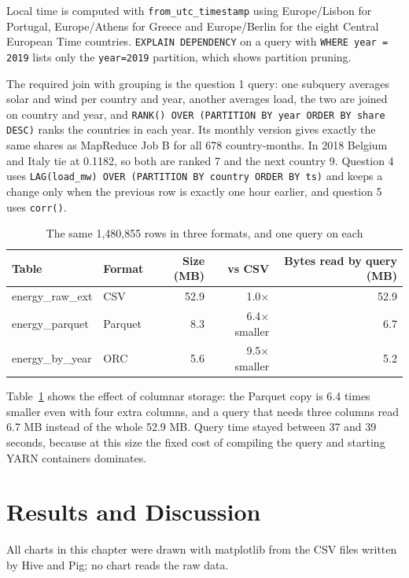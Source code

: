 \documentclass[12pt,a4paper]{report}
\begin{document}
Local time is computed with \texttt{from\_utc\_timestamp} using Europe/Lisbon for Portugal, Europe/Athens for Greece and Europe/Berlin for the eight Central European Time countries. \texttt{EXPLAIN DEPENDENCY} on a query with \texttt{WHERE year = 2019} lists only the \texttt{year=2019} partition, which shows partition pruning.

The required join with grouping is the question 1 query: one subquery averages solar and wind per country and year, another averages load, the two are joined on country and year, and \texttt{RANK() OVER (PARTITION BY year ORDER BY share DESC)} ranks the countries in each year. Its monthly version gives exactly the same shares as MapReduce Job B for all 678 country-months. In 2018 Belgium and Italy tie at 0.1182, so both are ranked 7 and the next country 9. Question 4 uses \texttt{LAG(load\_mw) OVER (PARTITION BY country ORDER BY ts)} and keeps a change only when the previous row is exactly one hour earlier, and question 5 uses \texttt{corr()}.

\begin{table}[H]
\centering\small
\caption{The same 1,480,855 rows in three formats, and one query on each}\label{tab:formats}
\begin{tabular}{llrrr}
\toprule
Table & Format & Size (MB) & vs CSV & Bytes read by query (MB)\\
\midrule
energy\_raw\_ext & CSV & 52.9 & 1.0$\times$ & 52.9\\
energy\_parquet & Parquet & 8.3 & 6.4$\times$ smaller & 6.7\\
energy\_by\_year & ORC & 5.6 & 9.5$\times$ smaller & 5.2\\
\bottomrule
\end{tabular}
\end{table}

Table~\ref{tab:formats} shows the effect of columnar storage: the Parquet copy is 6.4 times smaller even with four extra columns, and a query that needs three columns read 6.7 MB instead of the whole 52.9 MB. Query time stayed between 37 and 39 seconds, because at this size the fixed cost of compiling the query and starting YARN containers dominates.

\chapter{Results and Discussion}\label{ch:results}

All charts in this chapter were drawn with matplotlib \cite{hunter2007} from the CSV files written by Hive and Pig; no chart reads the raw data.
\end{document}
